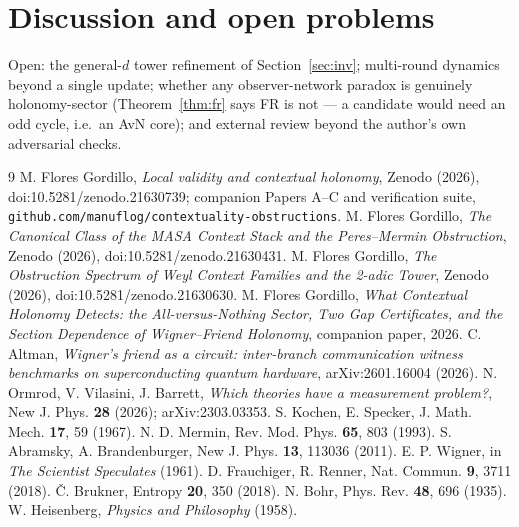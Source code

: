 \documentclass[11pt]{article}
\begin{document}
\section{Discussion and open problems}
Open: the general-$d$ tower refinement of Section~\ref{sec:inv}; multi-round dynamics
beyond a single update; whether any observer-network paradox is genuinely
holonomy-sector (Theorem~\ref{thm:fr} says FR is not --- a candidate would need an
odd cycle, i.e.\ an AvN core); and external review beyond the author's own adversarial checks.
\begin{thebibliography}{9}\small
{} M. Flores Gordillo, \emph{Local validity and contextual holonomy}, Zenodo (2026), doi:10.5281/zenodo.21630739; companion Papers A--C and verification suite, \texttt{github.com/manuflog/contextuality-obstructions}.
 M. Flores Gordillo, \emph{The Canonical Class of the MASA Context Stack and the
Peres--Mermin Obstruction}, Zenodo (2026), doi:10.5281/zenodo.21630431.
 M. Flores Gordillo, \emph{The Obstruction Spectrum of Weyl Context Families and the
2-adic Tower}, Zenodo (2026), doi:10.5281/zenodo.21630630.
 M. Flores Gordillo, \emph{What Contextual Holonomy Detects: the All-versus-Nothing
Sector, Two Gap Certificates, and the Section Dependence of Wigner--Friend Holonomy}, companion
paper, 2026.
 C. Altman, \emph{Wigner's friend as a circuit: inter-branch communication witness
benchmarks on superconducting quantum hardware}, arXiv:2601.16004 (2026).
 N. Ormrod, V. Vilasini, J. Barrett, \emph{Which theories have a measurement
problem?}, New J. Phys. \textbf{28} (2026); arXiv:2303.03353.
 S. Kochen, E. Specker, J. Math. Mech. \textbf{17}, 59 (1967).
 N. D. Mermin, Rev. Mod. Phys. \textbf{65}, 803 (1993).
 S. Abramsky, A. Brandenburger, New J. Phys. \textbf{13}, 113036 (2011).
 E. P. Wigner, in \emph{The Scientist Speculates} (1961).
 D. Frauchiger, R. Renner, Nat. Commun. \textbf{9}, 3711 (2018).
 \v C. Brukner, Entropy \textbf{20}, 350 (2018).
 N. Bohr, Phys. Rev. \textbf{48}, 696 (1935).
 W. Heisenberg, \emph{Physics and Philosophy} (1958).
\end{thebibliography}
\end{document}
